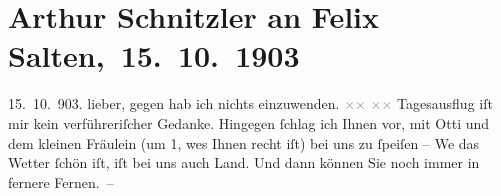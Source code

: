 

         
         \renewcommand{\erwaehntePersonen}{Personen: Caroline Kotter, Felix Salten, Ottilie Salten}
         \renewcommand{\erwaehnteInstitutionen}{Institutionen: Neue akademische Vereinigung}
         \renewcommand{\erwaehnteOrte}{Orte: Brünn, Deutsches Haus, Wien}
         \renewcommand{\erwaehnteWerke}{}
               \section[ Arthur Schnitzler an Felix Salten, 15. 10. 1903]{ Arthur Schnitzler an Felix Salten, 15. 10. 1903}\nopagebreak{}\rehead{ }\begin{ledgroupsized}[t]{13cm}\normalsize\beginnumbering{} \toendnotes[C]{\smallbreak\pagebreak[2]} 
\toendnotes[C]{\smallbreak}\pstart
           \raggedleft{}{\pb}15. 10. 903.\pend
           \pstart
           lieber, gegen \label{K_L02985-1v}\label{K_L02985-1h} hab ich nichts einzuwenden. \textcolor{gray}{×}\-\textcolor{gray}{×}{ }\textcolor{gray}{×}\-\textcolor{gray}{×}\pend
           \pstart
           Tagesausflug iſt mir kein verführeriſcher Gedanke. Hingegen ſchlag ich Ihnen vor, mit
                  Otti und dem kleinen Fräulein\label{K_L02985-2v}\label{K_L02985-2h} (um 1, we{\geminationn}s {\pb}Ihnen recht iſt) bei uns zu ſpeiſen – We{\geminationn} das Wetter ſchön iſt, iſt bei uns auch Land. Und dann
               können Sie noch immer in fernere Fernen. –\pend

\end{ledgroupsized}
